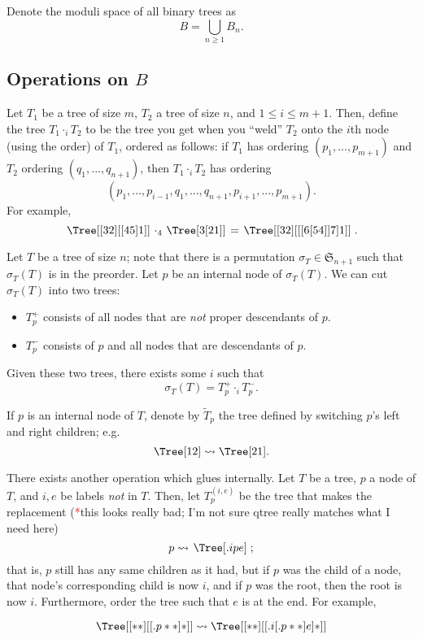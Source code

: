 \documentclass{article}
\newcommand{\tk}{\textcolor{red}{*}}
\newcommand{\Sym}{\mathfrak{S}}
\begin{document}
Denote the moduli space of all binary trees as
\[B=\bigcup_{n \ge 1}B_n. \]

\subsection{Operations on $B$}
Let $T_1$ be a tree of size $m$, $T_2$ a tree of size $n$, and $1 \le i \le m+1$.  Then, define the tree $T_1 \cdot_i T_2$ to be the tree you get when you ``weld'' $T_2$ onto the $i$th node (using the order) of $T_1$, ordered as follows: if $T_1$ has ordering $(p_1,...,p_{m+1})$ and $T_2$ ordering $(q_1,...,q_{n+1})$, then $T_1 \cdot_i T_2$ has ordering
\[(p_1,...,p_{i-1},q_1,...,q_{n+1},p_{i+1},...,p_{m+1}). \]
For example,
\[ \left. \Tree[ [ 3 2 ] [ [ 4 5 ]  1 ] ] \right.  \cdot_4  \left. \Tree[ 3 [ 2 1 ] ] \right. = \left. \Tree[ [ 3 2 ] [ [ [ 6 [ 5 4 ] ] 7 ]  1 ] ] \right..
\]

Let $T$ be a tree of size $n$; note that there is a permutation $\sigma_T \in \Sym_{n+1}$ such that $\sigma_T(T)$ is in the preorder.  Let $p$ be an internal node of $\sigma_T(T)$.  We can cut $\sigma_T(T)$ into two trees:
\begin{itemize}
\item $T_p^+$ consists of all nodes that are \textit{not} proper descendants of $p$.
\item $T_p^-$ consists of $p$ and all nodes that are descendants of $p$.
\end{itemize}
Given these two trees, there exists some $i$ such that
\[\sigma_T(T) = T_p^+ \cdot_i T_p^-. \]

If $p$ is an internal node of $T$, denote by $\widetilde{T}_p$ the tree defined by switching $p$'s left and right children; e.g.
\[\Tree[ 1 2 ] \rightsquigarrow \Tree[ 2 1 ]. \]

There exists another operation which glues internally.  Let $T$ be a tree, $p$ a node of $T$, and $i,e$ be labels \textit{not} in $T$.  Then, let $T^{(i,e)}_p$ be the tree that makes the replacement (\tk this looks really bad; I'm not sure qtree really matches what I need here)
\[p \rightsquigarrow \left. \Tree [.i p e ] \right. ; \]
that is, $p$ still has any same children as it had, but if $p$ was the child of a node, that node's corresponding child is now $i$, and if $p$ was the root, then the root is now $i$.  Furthermore, order the tree such that $e$ is at the end.  For example,

\[\Tree [ [ * * ] [ [.p * * ] * ] ] \rightsquigarrow \Tree [ [ * * ] [ [.i [.p * * ] e ] * ] ] \]
\end{document}

